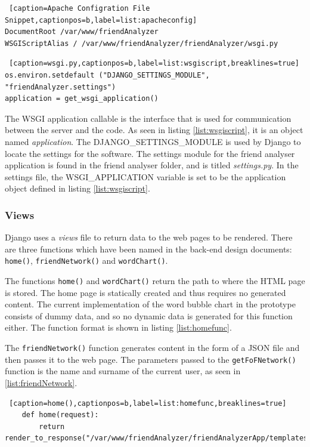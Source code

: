 \documentclass[12pt,onecolumn]{article}
\begin{document}
	\begin{lstlisting} [caption=Apache Configration File Snippet,captionpos=b,label=list:apacheconfig]
DocumentRoot /var/www/friendAnalyzer
WSGIScriptAlias / /var/www/friendAnalyzer/friendAnalyzer/wsgi.py
	\end{lstlisting}

	\begin{lstlisting} [caption=wsgi.py,captionpos=b,label=list:wsgiscript,breaklines=true]
os.environ.setdefault ("DJANGO_SETTINGS_MODULE", "friendAnalyzer.settings")
application = get_wsgi_application()
	\end{lstlisting}
	
	The WSGI application callable is the interface that is used for communication between the server and the code. As seen in listing \ref{list:wsgiscript}, it is an object named \textit{application}. The DJANGO\_SETTINGS\_MODULE is used by Django to locate the settings for the software. The settings module for the friend analyser application is found in the friend analyser folder, and is titled \textit{settings.py}. In the settings file, the WSGI\_APPLICATION variable is set to be the application object defined in listing \ref{list:wsgiscript}.
	
	\subsubsection{Views}
	
	Django uses a \textit{views} file to return data to the web pages to be rendered. There are three functions which have been named in the back-end design documents: \texttt{home()}, \texttt{friendNetwork()} and \texttt{wordChart()}.
	
	The functions \texttt{home()} and \texttt{wordChart()} return the path to where the HTML page is stored. The home page is statically created and thus requires no generated content. The current implementation of the word bubble chart in the prototype consists of dummy data, and so no dynamic data is generated for this function either. The function format is shown in listing \ref{list:homefunc}.
	
	The \texttt{friendNetwork()} function generates content in the form of a JSON file and then passes it to the web page. The parameters passed to the \texttt{getFoFNetwork()} function is the name and surname of the current user, as seen in \ref{list:friendNetwork}.
	\begin{lstlisting} [caption=home(),captionpos=b,label=list:homefunc,breaklines=true]
	def home(request):
		return render_to_response("/var/www/friendAnalyzer/friendAnalyzerApp/templates/index.html")
	\end{lstlisting}
	
\end{document}
